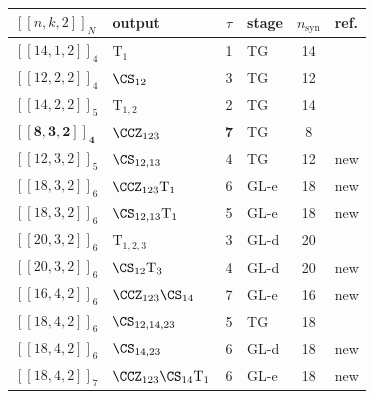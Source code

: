 \begin{table}[tbp]
\renewcommand{\thetable}{\tabVInum(b)}
\addtocounter{table}{-1}
\centering
\caption{}
\label{tab:smallest-l3}
\scriptsize
\setlength{\tabcolsep}{2.4pt}
\begin{tabular}{l l c l c l}
\toprule
$[[n,k,2]]_N$ & output & $\tau$ & stage & $n_\mathrm{syn}$ & ref. \\
\midrule
$[[14,1,2]]_{4}$ & $\mathrm{T}_{1}$ & 1 & TG & 14 & \cite{litinski2019magic} \\
$[[12,2,2]]_{4}$ & $\CS_{12}$ & 3 & TG & 12 & \cite{webster2023transversal,anqi2026qec} \\
$[[14,2,2]]_{5}$ & $\mathrm{T}_{1,2}$ & 2 & TG & 14 & \cite{bravyi2012magic} \\
$\mathbf{[[8,3,2]]_{4}}$ & $\CCZ_{123}$ & \textbf{7} & TG & 8 & \cite{bombin2007exact,jones2013composite,eastin2013distilling} \\
$[[12,3,2]]_{5}$ & $\CS_{12,13}$ & 4 & TG & 12 & new \\
$[[18,3,2]]_{6}$ & $\CCZ_{123}\mathrm{T}_{1}$ & 6 & GL-e & 18 & new \\
$[[18,3,2]]_{6}$ & $\CS_{12,13}\mathrm{T}_{1}$ & 5 & GL-e & 18 & new \\
$[[20,3,2]]_{6}$ & $\mathrm{T}_{1,2,3}$ & 3 & GL-d & 20 & \cite{nezami2022classification} \\
$[[20,3,2]]_{6}$ & $\CS_{12}\mathrm{T}_{3}$ & 4 & GL-d & 20 & new \\
$[[16,4,2]]_{6}$ & $\CCZ_{123}\CS_{14}$ & 7 & GL-e & 16 & new \\
$[[18,4,2]]_{6}$ & $\CS_{12,14,23}$ & 5 & TG & 18 & \cite{campbell2017unified} \\
$[[18,4,2]]_{6}$ & $\CS_{14,23}$ & 6 & GL-d & 18 & new \\
$[[18,4,2]]_{7}$ & $\CCZ_{123}\CS_{14}\mathrm{T}_{1}$ & 6 & GL-e & 18 & new \\

\end{tabular}
\end{table}
